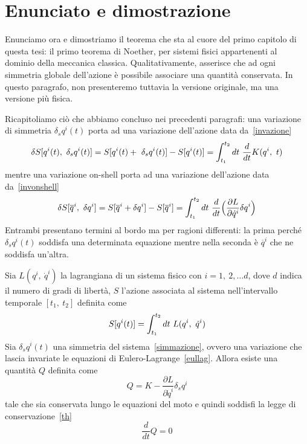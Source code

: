 \section{Enunciato e dimostrazione}
    Enunciamo ora e dimostriamo il teorema che sta al cuore del primo capitolo di questa tesi: il primo teorema di Noether, per sistemi fisici appartenenti al dominio della meccanica classica. Qualitativamente, asserisce che ad ogni simmetria globale dell'azione è possibile associare una quantità conservata. In questo paragrafo, non presenteremo tuttavia la versione originale, ma una versione più fisica. 

    Ricapitoliamo ciò che abbiamo concluso nei precedenti paragrafi: una variazione di simmetria $\delta_s q^i(t)$ porta ad una variazione dell'azione data da~\eqref{invazione} 
    \begin{equation*}
        \delta S[q^i(t), ~\delta_s q^i(t)] = S[q^i(t) + ~\delta_s q^i(t)] - S[q^i(t)] = \int_{t_1}^{t_2}dt~ \frac{d}{dt} K(q^i, ~t)
    \end{equation*}
    mentre una variazione on-shell porta ad una variazione dell'azione data da~\eqref{invonshell} 
    \begin{equation*}
        \delta S[\overline q^i,~\delta q^i] = S[\overline q^i + \delta q^i] - S[\overline q^i] = \int_{t_1}^{t_2}dt~ \frac{d}{dt} \Big( \frac{\partial L}{\partial\dot q^i} \delta q^i \Big )
    \end{equation*}
    Entrambi presentano termini al bordo ma per ragioni differenti: la prima perché $\delta_s q^i(t)$ soddisfa una determinata equazione mentre nella seconda è $\overline q^i$ che ne soddisfa un'altra.

    \begin{theorem}
        Sia $L(q^i,~\dot q^i)$ la lagrangiana di un sistema fisico con $i=1,~2,\ldots d$, dove $d$ indica il numero di gradi di libertà, $S$ l'azione associata al sistema nell'intervallo temporale $[t_1,~t_2]$ definita come
    \begin{equation*}
        S[q^i(t)] = \int_{t_1}^{t_2}dt~ L(q^i,~\dot q^i)
    \end{equation*}
        Sia $\delta_s q^i(t)$ una simmetria del sistema~\eqref{simmazione}, ovvero una variazione che lascia invariate le equazioni di Eulero-Lagrange~\eqref{eullag}. Allora esiste una quantità $Q$ definita come
    \begin{equation}\label{carica}
        Q = K - \frac{\partial L}{\partial \dot q^i} \delta_s q^i
    \end{equation}
        tale che sia conservata lungo le equazioni del moto e quindi soddisfi la legge di conservazione~\eqref{th}
    \begin{equation*} 
        \frac{d}{dt} Q = 0
    \end{equation*}
    \end{theorem}

